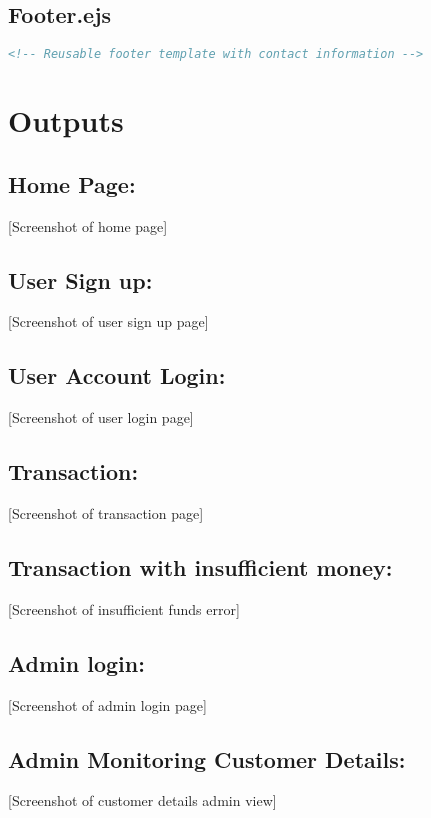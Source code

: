 \documentclass{report}
\begin{document}
\section{Footer.ejs}
\begin{lstlisting}[language=HTML]
<!-- Reusable footer template with contact information -->
\end{lstlisting}

\chapter{Outputs}
\section*{Home Page:}
[Screenshot of home page]

\section*{User Sign up:}
[Screenshot of user sign up page]

\section*{User Account Login:}
[Screenshot of user login page]

\section*{Transaction:}
[Screenshot of transaction page]

\section*{Transaction with insufficient money:}
[Screenshot of insufficient funds error]

\section*{Admin login:}
[Screenshot of admin login page]

\section*{Admin Monitoring Customer Details:}
[Screenshot of customer details admin view]
\end{document}
